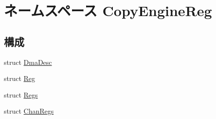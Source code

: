 \hypertarget{namespaceCopyEngineReg}{
\section{ネームスペース CopyEngineReg}
\label{namespaceCopyEngineReg}
}
\subsection*{構成}
\begin{DoxyCompactItemize}
\item 
struct \hyperlink{structCopyEngineReg_1_1DmaDesc}{DmaDesc}
\item 
struct \hyperlink{structCopyEngineReg_1_1Reg}{Reg}
\item 
struct \hyperlink{structCopyEngineReg_1_1Regs}{Regs}
\item 
struct \hyperlink{structCopyEngineReg_1_1ChanRegs}{ChanRegs}
\end{DoxyCompactItemize}
